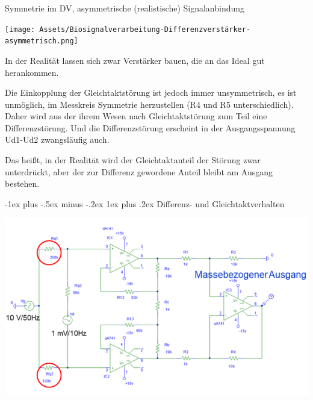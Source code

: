 \documentclass[a4paper]{article}
\makeatletter
\renewcommand{\subsubsection}{\@startsection{subsubsection}{3}{0mm}%
 {-1ex plus -.5ex minus -.2ex}%
 {1ex plus .2ex}%
 {\normalfont\small\bfseries}}
\makeatother
\begin{document}
\begin{multicols}{3}
  Symmetrie im DV, asymmetrische (realistische) Signalanbindung

  \begin{itemize*}
    \item \texttt{[image: Assets/Biosignalverarbeitung-Differenzverstärker-asymmetrisch.png]}
    \item In der Realität lassen sich zwar Verstärker bauen, die an das Ideal gut herankommen.
    \item Die Einkopplung der Gleichtaktstörung ist jedoch immer unsymmetrisch, es ist unmöglich, im Messkreis Symmetrie herzustellen (R4 und R5 unterschiedlich). Daher wird aus der ihrem Wesen nach Gleichtaktstörung zum Teil eine Differenzstörung. Und die Differenzstörung erscheint in der Ausgangsspannung Ud1-Ud2 zwangsläufig auch.
    \item Das heißt, in der Realität wird der Gleichtaktanteil der Störung zwar unterdrückt, aber der zur Differenz gewordene Anteil bleibt am Ausgang bestehen.
  \end{itemize*}

  \subsubsection{Differenz- und Gleichtaktverhalten}\label{differenz--und-gleichtaktverhalten}

  \includegraphics[width=.5\linewidth]{Assets/Biosignalverarbeitung-Diff-und-Gleichtakt.png}


\end{multicols}
\end{document}

